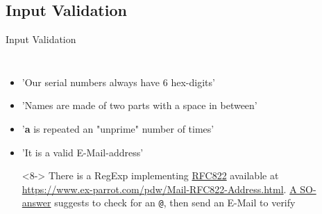 \documentclass[english,aspectratio=169]{beamer}
\begin{document}
\subsection{Input Validation}
\begin{frame}{Input Validation}
\begin{columns}
        \begin{itemize}
        \item 'Our serial numbers always have 6 hex-digits'\\
        \item<3-> 'Names are made of two parts with a space in between'\textdagger\\
        \item<5-> '\textbf{a} is repeated an "unprime" number of times'\\
        \item<7-> 'It is a valid E-Mail-address'\\
            \begin{visibleenv}<8->
                There is a RegExp implementing \href{https://www.rfc-editor.org/rfc/rfc822.html\#section-6.1}{RFC822} available at \url{https://www.ex-parrot.com/pdw/Mail-RFC822-Address.html}. \href{https://stackoverflow.com/a/20773069/1266906}{A SO-answer} suggests to check for an \texttt{@}, then send an E-Mail to verify
            \end{visibleenv}
        \end{itemize}
        \begin{center}
        \end{center}
\end{columns}
\end{frame}
\end{document}

